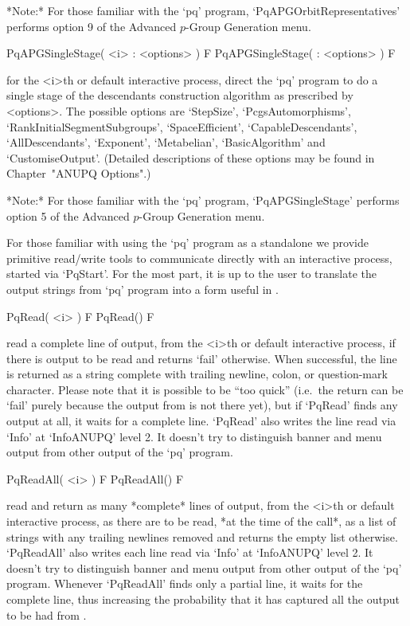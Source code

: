 *Note:*
For those familiar  with  the  `pq'  program,  `PqAPGOrbitRepresentatives'
performs option 9 of the Advanced $p$-Group Generation menu.

\>PqAPGSingleStage( <i> : <options> ) F
\>PqAPGSingleStage( : <options> ) F

for the <i>th or default interactive {\ANUPQ} process,  direct  the  `pq'
program to do a single stage of the descendants construction algorithm as
prescribed  by  <options>.   The   possible   options   are   `StepSize',
`PcgsAutomorphisms',   `RankInitialSegmentSubgroups',   `SpaceEfficient',
`CapableDescendants',   `AllDescendants',    `Exponent',    `Metabelian',
`BasicAlgorithm' and `CustomiseOutput'. (Detailed descriptions  of  these
options may be found in Chapter~"ANUPQ Options".)

*Note:*
For those familiar with  the  `pq'  program,  `PqAPGSingleStage'  performs
option 5 of the Advanced $p$-Group Generation menu.


For those familiar with using the `pq' program as a standalone we  provide
primitive read/write tools to communicate directly  with  an  interactive
{\ANUPQ} process, started via `PqStart'. For the most part, it is  up  to
the user to translate the output strings from `pq'  program  into  a  form
useful in {\GAP}.

\>PqRead( <i> ) F
\>PqRead() F

read a complete line of  {\ANUPQ}  output,  from  the  <i>th  or  default
interactive {\ANUPQ} process, if there is output to be read  and  returns
`fail' otherwise. When successful, the  line  is  returned  as  a  string
complete with trailing newline, colon, or question-mark character. Please
note that it is possible to be ``too  quick''  (i.e.~the  return  can  be
`fail' purely because the output from {\ANUPQ} is not there yet), but  if
`PqRead' finds any output at all, it waits for a complete line.  `PqRead'
also writes the line read via `Info' at `InfoANUPQ' level 2.  It  doesn't
try to distinguish banner and menu output from other output of  the  `pq'
program.

\>PqReadAll( <i> ) F
\>PqReadAll() F

read and return as many *complete* lines of  {\ANUPQ}  output,  from  the
<i>th or default interactive {\ANUPQ} process, as there are to  be  read,
*at the time of the call*,  as  a  list  of  strings  with  any  trailing
newlines removed and returns the empty list otherwise.  `PqReadAll'  also
writes each line read via `Info' at `InfoANUPQ' level 2. It  doesn't  try
to distinguish banner and menu output  from  other  output  of  the  `pq'
program. Whenever `PqReadAll' finds only a partial line, it waits for  the
complete line, thus increasing the probability that it has  captured  all
the output to be had from {\ANUPQ}.

